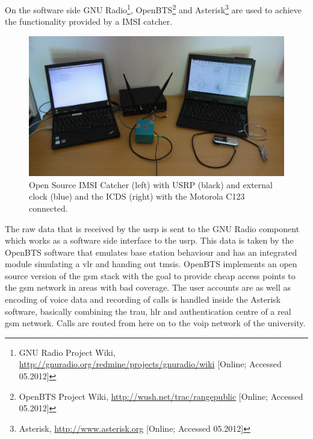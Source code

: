 On the software side GNU Radio\footnote{GNU Radio Project Wiki, \url{http://gnuradio.org/redmine/projects/gnuradio/wiki} [Online; Accessed 05.2012]}, OpenBTS\footnote{OpenBTS Project Wiki, \url{http://wush.net/trac/rangepublic} [Online; Accessed 05.2012]} and Asterisk\footnote{Asterisk, \url{http://www.asterisk.org} [Online; Accessed 05.2012]} are used to achieve the functionality provided by a IMSI catcher.
\begin{figure}
\centering
\includegraphics[width=.95\textwidth]{../Images/catcherICDS}
\caption{Open Source IMSI Catcher (left) with USRP (black) and external clock (blue) and the ICDS (right) with the Motorola C123 connected.}
\label{fig:setup}
\end{figure}
The raw data that is received by the \gls{usrp} is sent to the GNU Radio component which works as a software side interface to the \gls{usrp}.
This data is taken by the OpenBTS software that emulates base station behaviour and has an integrated module simulating a \gls{vlr} and handing out \glspl{tmsi}.
OpenBTS implements an open source version of the \gls{gsm} stack with the goal to provide cheap access points to the \gls{gsm} network in areas with bad coverage.
The user accounts are as well as encoding of voice data and recording of calls is handled inside the Asterisk software, basically combining the \gls{trau}, \gls{hlr} and authentication centre of a real \gls{gsm} network.
Calls are routed from here on to the \gls{voip} network of the university.

